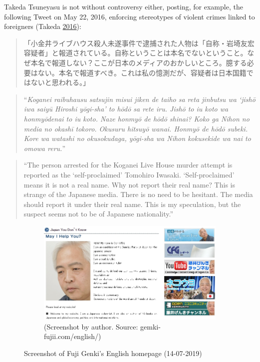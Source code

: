 \documentclass[10pt,british,A4paper,,openany]{memoir}
\begin{document}
Takeda Tsuneyasu is not without controversy either, posting, for
example, the following Tweet on May 22, 2016, enforcing stereotypes of
violent crimes linked to foreigners (Takeda
\protect\hyperlink{ref-takeda_eng._2016}{2016}):

\begin{quote}
「小金井ライブハウス殺人未遂事件で逮捕された人物は「自称・岩埼友宏容疑者」と報道されている。自称ということは本名でないということ。なぜ本名で報道しない？ここが日本のメディアのおかしいところ。臆する必要はない。本名で報道すべき。これは私の憶測だが、容疑者は日本国籍ではないと思われる。」
\end{quote}

\begin{quote}
``\emph{Koganei raibuhausu satsujin misui jiken de taiho sa reta
jinbutsu wa `jishō iwa saiyū Hiroshi yōgi-sha' to hōdō sa rete iru.
Jishō to iu koto wa honmyōdenai to iu koto. Naze honmyō de hōdō shinai?
Koko ga Nihon no media no okashī tokoro. Okusuru hitsuyō wanai. Honmyō
de hōdō subeki. Kore wa watashi no okusokudaga, yōgi-sha wa Nihon
kokusekide wa nai to omowa reru.}''
\end{quote}

\begin{quote}
``The person arrested for the Koganei Live House murder attempt is
reported as the `self-proclaimed' Tomohiro Iwasaki. `Self-proclaimed'
means it is not a real name. Why not report their real name? This is
strange of the Japanese media. There is no need to be hesitant. The
media should report it under their real name. This is my speculation,
but the suspect seems not to be of Japanese nationality.''
\end{quote}

\begin{figure}[!htb]
 \centering
 \begin{subfigure}[b]{1\textwidth}
  \includegraphics[width=\textwidth]{images/genkifuji.jpg}
  \caption*{(Screenshot by author. Source: gemki-fujii.com/english/)}
 \end{subfigure}
 \caption{Screenshot of Fuji Genki's English homepage (14-07-2019)}\label{fig:genkifuji}
\end{figure}
\end{document}
